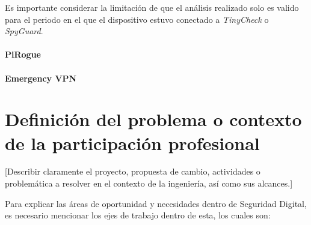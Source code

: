 \documentclass[12pt]{caltech_thesis}
\begin{document}
Es importante considerar la limitación de que el análisis realizado solo es valido para el periodo en el que el dispositivo estuvo conectado a \textit{TinyCheck} o \textit{SpyGuard}.

\subsubsection{PiRogue}

\subsubsection{Emergency VPN}





\chapter{Definición del problema o contexto de la participación profesional}

[Describir claramente el proyecto, propuesta de cambio, actividades o problemática a resolver en el contexto de la ingeniería, así como sus alcances.]

Para explicar las áreas de oportunidad y necesidades dentro de Seguridad Digital, es necesario mencionar los ejes de trabajo dentro de esta, los cuales son:
\end{document}
